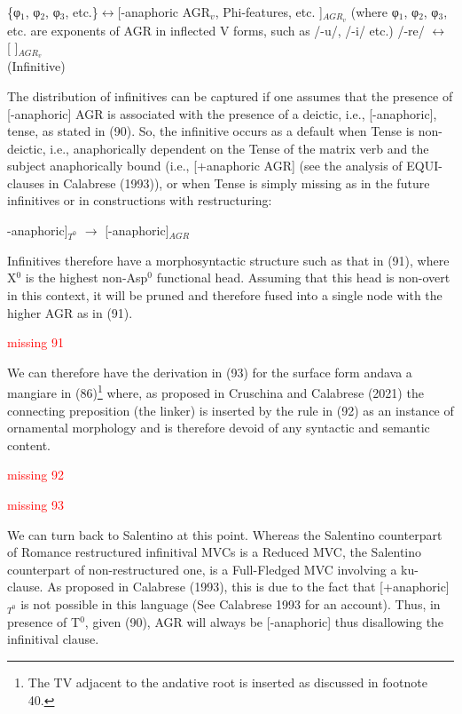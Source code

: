 \documentclass[output=paper,colorlinks,citecolor=brown,
]{langscibook}
\begin{document}
\ea
    \ea \{φ$_1$, φ$_2$, φ$_3$, etc.\}$\longleftrightarrow$[-anaphoric  AGR$_v$, Phi-features, etc. ]$_{AGR_v}$
       (where φ$_1$, φ$_2$, φ$_3$, etc. are exponents of AGR in inflected V forms, such as /-u/, /-i/ etc.)
    \ex /-re/ $\longleftrightarrow$  [   ]$_{AGR_v}$\\
     (Infinitive)
    \z
\z

The distribution of infinitives can be captured if one assumes that the presence of [-anaphoric] AGR is associated with the presence of a deictic, i.e., [-anaphoric], tense, as stated in (90). So, the infinitive occurs as a default when Tense is non-deictic, i.e., anaphorically dependent on the Tense of the matrix verb and the subject anaphorically bound (i.e., [+anaphoric AGR] (see the analysis of EQUI-clauses in Calabrese (1993)), or when Tense is simply missing as in the future infinitives or in constructions with restructuring:

\ea  {[}-anaphoric{]}$_{T^0}$ $\rightarrow$ [-anaphoric]$_{AGR}$
\z

Infinitives therefore have a morphosyntactic structure such as that in (91), where X$^0$  is the highest non-Asp$^0$ functional head.  Assuming that this head is non-overt in this context, it will be pruned and therefore fused into a single node with the higher AGR as  in (91). 

\ea
\textcolor{red}{missing 91}
\z

We can therefore have the derivation in (93) for the surface form andava a mangiare in (86)\footnote{  The TV adjacent to the andative root is inserted as discussed in footnote 40.}  where, as proposed in Cruschina and Calabrese (2021) the connecting preposition (the linker) is inserted by the rule in (92) as an instance of ornamental morphology and is therefore devoid of any syntactic and semantic content. 

\ea
\textcolor{red}{missing 92}
\z

\ea
\textcolor{red}{missing 93}
\z

We can turn back to Salentino at this point.  Whereas the Salentino counterpart of Romance restructured infinitival MVCs is a Reduced MVC, the Salentino counterpart of non-restructured one, is a Full-Fledged MVC involving a ku-clause.  As proposed in Calabrese (1993), this is due to the fact that [+anaphoric]$_{T^0}$  is not possible in this language (See Calabrese 1993 for an account).  Thus, in presence of T$^0$, given (90), AGR will always be [-anaphoric] thus disallowing the infinitival clause.
\end{document}
